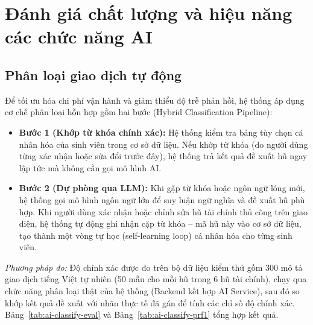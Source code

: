 \section{Đánh giá chất lượng và hiệu năng các chức năng AI}
\label{sec:danh-gia-ai}

\subsection{Phân loại giao dịch tự động}
\label{sec:kiem-thu-api}
Để tối ưu hóa chi phí vận hành và giảm thiểu độ trễ phản hồi, hệ thống áp dụng cơ chế phân loại hỗn hợp gồm hai bước (Hybrid Classification Pipeline):
\begin{itemize}
    \item \textbf{Bước 1 (Khớp từ khóa chính xác):} Hệ thống kiểm tra bảng tùy chọn cá nhân hóa của sinh viên trong cơ sở dữ liệu. Nếu khớp từ khóa (do người dùng từng xác nhận hoặc sửa đổi trước đây), hệ thống trả kết quả đề xuất hũ ngay lập tức mà không cần gọi mô hình AI.
    \item \textbf{Bước 2 (Dự phòng qua LLM):} Khi gặp từ khóa hoặc ngôn ngữ lóng mới, hệ thống gọi mô hình ngôn ngữ lớn để suy luận ngữ nghĩa và đề xuất hũ phù hợp. Khi người dùng xác nhận hoặc chỉnh sửa hũ tài chính thủ công trên giao diện, hệ thống tự động ghi nhận cặp từ khóa -- mã hũ này vào cơ sở dữ liệu, tạo thành một vòng tự học (self-learning loop) cá nhân hóa cho từng sinh viên.
\end{itemize}

\textit{Phương pháp đo:} Độ chính xác được đo trên bộ dữ liệu kiểm thử gồm 300 mô tả giao dịch tiếng Việt tự nhiên (50 mẫu cho mỗi hũ trong 6 hũ tài chính), chạy qua chức năng phân loại thật của hệ thống (Backend kết hợp AI Service), sau đó so khớp kết quả đề xuất với nhãn thực tế đã gán để tính các chỉ số độ chính xác. Bảng~\ref{tab:ai-classify-eval} và Bảng~\ref{tab:ai-classify-prf1} tổng hợp kết quả.

